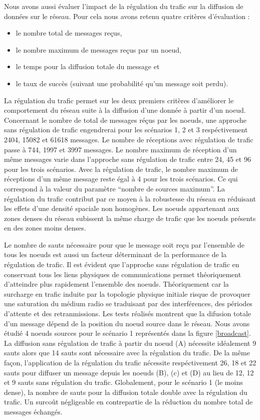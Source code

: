 \documentclass[sigconf]{acmart}
\begin{document}
Nous avons aussi évaluer l'impact de la régulation du trafic sur la diffusion de données sur le réseau. Pour cela nous avons retenu quatre critères d'évaluation : 
\begin{itemize}
\item le nombre total de messages reçus, 
\item le nombre maximum de messages reçus par un noeud, 
\item le temps pour la diffusion totale du message et 
\item le taux de succès (suivant une probabilité qu'un message soit perdu).
\end{itemize} 
La régulation du trafic permet sur les deux premiers critères d'améliorer le comportement du réseau suite à la diffusion d'une donnée à partir d'un noeud. Concernant le nombre de total de messages réçus par les noeuds, une approche sans régulation de trafic engendrerai pour les scénarios 1, 2 et 3 respéctivement 2404, 15082 et 61618 messages. Le nombre de réceptions avec régulation de trafic passe à 744, 1997 et 3997 messages. Le nombre maximum de réception d'un même messages varie dans l'approche sans régulation de trafic entre 24, 45 et 96 pour les trois scénarios. Avec la régulation de trafic, le nombre maximum de réceptions d'un même message reste égal à 4 pour les trois scénarios. Ce qui correspond à la valeur du paramètre "`nombre de sources maximum"'. La régulation du trafic contribut par ce moyen à la robustesse du réseau en réduisant les effets d'une densité spaciale non homogènes. Les noeuds appartenant aux zones denses du réseau subissent la même charge de trafic que les noeuds présents en des zones moins denses.

Le nombre de sauts nécessaire pour que le message soit reçu par l'ensemble de tous les noeuds est aussi un facteur déterminant de la performance de la régulation de trafic. Il est évident que l'approche sans régulation de trafic en conservant tous les liens physiques de communications permet théoriquement d'atteindre plus rapidement l'ensemble des noeuds. Théoriquement car la surcharge en trafic induite par la topologie physique initiale risque de provoquer une saturation du médium radio se traduisant par des interférences, des périodes d'attente et des retranmissions. Les tests réalisés montrent que la difusion totale d'un message dépend de la position du noeud source dans le réseau. Nous avons étudié 4 noeuds sources pour le scénario 1 représentés dans la figure \ref{broadcast}. La diffusion sans régulation de trafic à partir du noeud (A) nécessite idéalement 9 sauts alors que 14 sauts sont nécessaire avec la régulation du trafic. De la même façon, l'application de la régulation du trafic nécessite respéctivement 26, 18 et 22 sauts pour diffuser un message depuis les noeuds (B), (c) et (D) au lieu de 12, 12 et 9 sauts sans régulation du trafic. Globalement, pour le scénario 1 (le moins dense), la nombre de sauts pour la diffusion totale double avec la régulation du trafic. Un surcoût négligeable en contrepartie de la réduction du nombre total de messages échangés.
\end{document}

